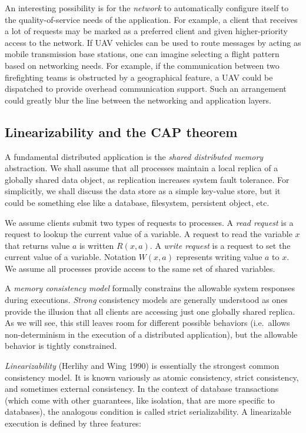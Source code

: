\documentclass[]             %
{NASA}                       %
\theoremstyle{definition}
\begin{document}
An interesting possibility is for the \emph{network} to automatically
configure itself to the quality-of-service needs of the application. For
example, a client that receives a lot of requests may be marked as a
preferred client and given higher-priority access to the network. If UAV
vehicles can be used to route messages by acting as mobile transmission
base stations, one can imagine selecting a flight pattern based on
networking needs. For example, if the communication between two
firefighting teams is obstructed by a geographical feature, a UAV could
be dispatched to provide overhead communication support. Such an
arrangement could greatly blur the line between the networking and
application layers.

\hypertarget{linearizability-and-the-cap-theorem}{%
\subsection{Linearizability and the CAP
theorem}\label{linearizability-and-the-cap-theorem}}

\label{sec:atomic}

A fundamental distributed application is the \emph{shared distributed
memory} abstraction. We shall assume that all processes maintain a local
replica of a globally shared data object, as replication increases
system fault tolerance. For simplicitly, we shall discuss the data store
as a simple key-value store, but it could be something else like a
database, filesystem, persistent object, etc.

We assume clients submit two types of requests to processes. A
\emph{read request} is a request to lookup the current value of a
variable. A request to read the variable \(x\) that returns value \(a\)
is written \(R(x,a)\). A \emph{write request} is a request to set the
current value of a variable. Notation \(W(x,a)\) represents writing
value \(a\) to \(x\). We assume all processes provide access to the same
set of shared variables.

A \emph{memory consistency model} formally constrains the allowable
system responses during executions. \emph{Strong} consistency models are
generally understood as ones provide the illusion that all clients are
accessing just one globally shared replica. As we will see, this still
leaves room for different possible behaviors (i.e.~allows
non-determinism in the execution of a distributed application), but the
allowable behavior is tightly constrained.

\emph{Linearizability} (Herlihy and Wing 1990) is essentially the
strongest common consistency model. It is known variously as atomic
consistency, strict consistency, and sometimes external consistency. In
the context of database transactions (which come with other guarantees,
like isolation, that are more specific to databases), the analogous
condition is called strict serializability. A linearizable execution is
defined by three features:
\end{document}
